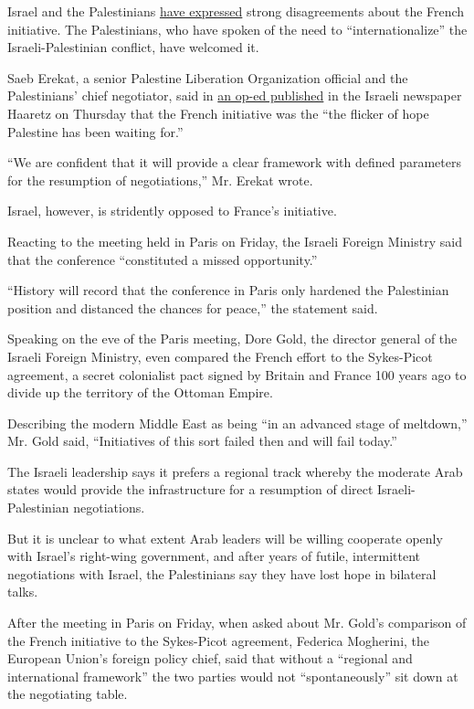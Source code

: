 Israel and the Palestinians
\href{http://www.nytimes.com/2016/05/19/world/middleeast/french-plan-for-middle-east-peace-talks-hits-a-familiar-snag.html}{have
expressed} strong disagreements about the French initiative. The
Palestinians, who have spoken of the need to ``internationalize'' the
Israeli-Palestinian conflict, have welcomed it.

Saeb Erekat, a senior Palestine Liberation Organization official and the
Palestinians' chief negotiator, said in
\href{http://www.haaretz.com/opinion/1.722924}{an op-ed published} in
the Israeli newspaper Haaretz on Thursday that the French initiative was
the ``the flicker of hope Palestine has been waiting for.''

``We are confident that it will provide a clear framework with defined
parameters for the resumption of negotiations,'' Mr. Erekat wrote.

Israel, however, is stridently opposed to France's initiative.

Reacting to the meeting held in Paris on Friday, the Israeli Foreign
Ministry said that the conference ``constituted a missed opportunity.''

``History will record that the conference in Paris only hardened the
Palestinian position and distanced the chances for peace,'' the
statement said.

Speaking on the eve of the Paris meeting, Dore Gold, the director
general of the Israeli Foreign Ministry, even compared the French effort
to the Sykes-Picot agreement, a secret colonialist pact signed by
Britain and France 100 years ago to divide up the territory of the
Ottoman Empire.

Describing the modern Middle East as being ``in an advanced stage of
meltdown,'' Mr. Gold said, ``Initiatives of this sort failed then and
will fail today.''

The Israeli leadership says it prefers a regional track whereby the
moderate Arab states would provide the infrastructure for a resumption
of direct Israeli-Palestinian negotiations.

But it is unclear to what extent Arab leaders will be willing cooperate
openly with Israel's right-wing government, and after years of futile,
intermittent negotiations with Israel, the Palestinians say they have
lost hope in bilateral talks.

After the meeting in Paris on Friday, when asked about Mr. Gold's
comparison of the French initiative to the Sykes-Picot agreement,
Federica Mogherini, the European Union's foreign policy chief, said that
without a ``regional and international framework'' the two parties would
not ``spontaneously'' sit down at the negotiating table.


